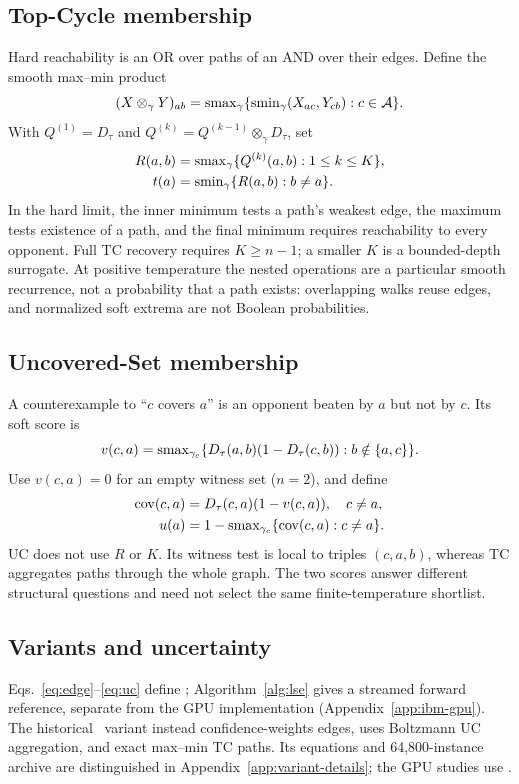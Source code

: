 \subsection{Top-Cycle membership}
Hard reachability is an OR over paths of an AND over their edges. Define the smooth max--min product
\begin{equation}\label{eq:product}
(X\otimes_\gamma Y)_{ab}=\operatorname{smax}_\gamma\{\operatorname{smin}_\gamma(X_{ac},Y_{cb}):c\in\mathcal{A}\}.
\end{equation}
With $Q^{(1)}=D_\tau$ and $Q^{(k)}=Q^{(k-1)}\otimes_\gamma D_\tau$, set
\begin{align}
R(a,b)&=\operatorname{smax}_\gamma\{Q^{(k)}(a,b):1\le k\le K\},\label{eq:reach}\\
t(a)&=\operatorname{smin}_\gamma\{R(a,b):b\ne a\}.\label{eq:tc}
\end{align}
In the hard limit, the inner minimum tests a path's weakest edge, the maximum tests existence of a path, and the final minimum requires reachability to every opponent. Full TC recovery requires $K\ge n-1$; a smaller $K$ is a bounded-depth surrogate. At positive temperature the nested operations are a particular smooth recurrence, not a probability that a path exists: overlapping walks reuse edges, and normalized soft extrema are not Boolean probabilities.

\subsection{Uncovered-Set membership}
A counterexample to ``$c$ covers $a$'' is an opponent beaten by $a$ but not by $c$. Its soft score is
\begin{equation}\label{eq:violation}
v(c,a)=\operatorname{smax}_{\gamma_c}\{D_\tau(a,b)(1-D_\tau(c,b)):b\notin\{a,c\}\}.
\end{equation}
Use $v(c,a)=0$ for an empty witness set ($n=2$), and define
\begin{align}
\operatorname{cov}(c,a)&=D_\tau(c,a)(1-v(c,a)),\quad c\ne a,\\
u(a)&=1-\operatorname{smax}_{\gamma_c}\{\operatorname{cov}(c,a):c\ne a\}.\label{eq:uc}
\end{align}
UC does not use $R$ or $K$. Its witness test is local to triples $(c,a,b)$, whereas TC aggregates paths through the whole graph. The two scores answer different structural questions and need not select the same finite-temperature shortlist. 



\subsection{Variants and uncertainty}\label{sec:variants}
Eqs.~\eqref{eq:edge}--\eqref{eq:uc} define \LSE; Algorithm~\ref{alg:lse} gives a streamed forward reference, separate from the GPU implementation (Appendix~\ref{app:ibm-gpu}). The historical \WB\ variant instead confidence-weights edges, uses Boltzmann UC aggregation, and exact max--min TC paths. Its equations and 64,800-instance archive are distinguished in Appendix~\ref{app:variant-details}; the GPU studies use \LSE.


